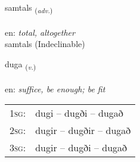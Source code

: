 \documentclass[frontgrid, backgrid]{flacards}\usepackage[]{graphicx}\usepackage[]{color}
\begin{document}

\renewcommand{\flhead}{\vskip5pt \fboxsep=0pt {\small\bfseries\footnotesize Atviksorð | Adverb}}
\renewcommand{\fcfoot}{\vskip5pt \fboxsep=0pt \hspace{2pt}{\small\bfseries\footnotesize 2K}}

\renewcommand{\blhead}{\vskip5pt {\small\bfseries\footnotesize Atviksorð | Adverb }}
\renewcommand{\bcfoot}{\vskip5pt \hspace{2pt}{\small\bfseries\footnotesize 2K}}


{samtals \small{\textsubscript{(\textit{adv.})}} \\[1ex]
\textphonetic{[samtʰals]} \\
en: \emph{total, altogether} \\  [2ex]
samtals (Indeclinable)}

\renewcommand{\flhead}{\vskip5pt \fboxsep=0pt {\small\bfseries\footnotesize Sagnorð | Verb}}
\renewcommand{\fcfoot}{\vskip5pt \fboxsep=0pt \hspace{2pt}{\small\bfseries\footnotesize 2K}}

\renewcommand{\blhead}{\vskip5pt {\small\bfseries\footnotesize Sagnorð | Verb }}
\renewcommand{\bcfoot}{\vskip5pt \hspace{2pt}{\small\bfseries\footnotesize 2K}}


{duga \small{\textsubscript{(\textit{v.})}} \\[1ex] %
\textphonetic{[tʏːɣa]} \\
en: \emph{suffice, be enough; be fit} \\  [2ex]
\renewcommand*{\arraystretch}{0.8}
\begin{tabular}{p{1cm}l}
\textsc{1sg}: & dugi -- dugði -- dugað \\ 
\textsc{2sg}: & dugir -- dugðir -- dugað \\ 
\textsc{3sg}: & dugir -- dugði -- dugað \\ 
\end{tabular}
}

\renewcommand{\flhead}{\vskip5pt \fboxsep=0pt {\small\bfseries\footnotesize Sagnorð | Verb}}
\renewcommand{\fcfoot}{\vskip5pt \fboxsep=0pt \hspace{2pt}{\small\bfseries\footnotesize 2K}}
\end{document}
